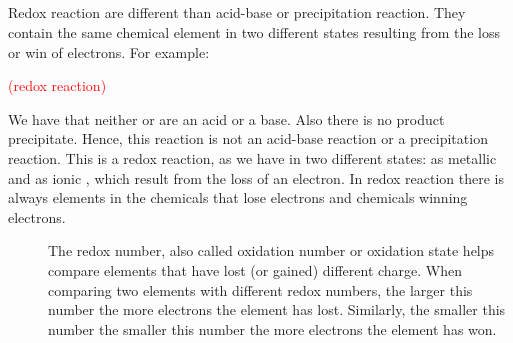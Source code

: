\documentclass[main.tex]{subfiles} %
\begin{document}
\begin{description}
\section{\color{blue!30!black}{Redox reactions}}
Redox reaction are different than acid-base or precipitation reaction. They contain the same chemical element in two different states resulting from the loss or win of electrons. For example:
\begin{center}    \textcolor{red}{ (redox reaction) }      \end{center}
We have that neither  or  are an acid or a base. Also there is no product precipitate. Hence, this reaction is not an acid-base reaction or a precipitation reaction. This is a redox reaction, as we have  in two different states: as metallic  and as ionic  , which result from the loss of an electron. In redox reaction there is always elements in the chemicals that lose electrons and chemicals winning electrons.
\sloppy 
\begin{description}
\item[] The redox number, also called oxidation number or oxidation state helps compare elements that have lost (or gained) different charge. When comparing two elements with different redox numbers, the larger this number the more electrons the element has lost. Similarly, the smaller this number the smaller this number the more electrons the element has won.


\end{description}
\end{description}
\end{document}
